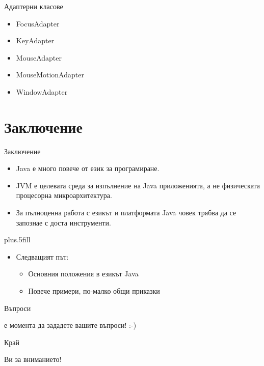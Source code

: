 \documentclass{beamer}
\begin{document}
\begin{frame}{Адаптерни класове}
  \transdissolve
  \begin{itemize}
  \item FocusAdapter
  \item KeyAdapter
  \item MouseAdapter
  \item MouseMotionAdapter
  \item WindowAdapter
  \end{itemize}
\end{frame}

\section*{Заключение}

\begin{frame}{Заключение}
  \transdissolve
  \begin{itemize}
  \item
    Java \alert{е много повече от език за програмиране}.
  \item
    JVM \alert{е целевата среда за изпълнение} на Java приложенията, а
    не физическата процесорна микроархитектура.
  \item
    За пълноценна работа с езикът и платформата Java човек трябва да
    се запознае с доста инструменти.
  \end{itemize}
  
  \vskip0pt plus.5fill
  \begin{itemize}
  \item
    Следващият път:
    \begin{itemize}
    \item
      Основния положения в езикът Java
    \item
      Повече примери, по-малко общи приказки
    \end{itemize}
  \end{itemize}
\end{frame}

\begin{frame}{Въпроси}
  \transdissolve
  \begin{center}
     е момента да зададете вашите въпроси! :-)
  \end{center}
\end{frame}

\begin{frame}{Край}
  \transdissolve
  \begin{center}
     Ви за вниманието!
  \end{center}
\end{frame}
\end{document}
